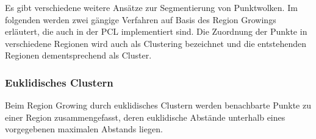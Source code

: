 Es gibt verschiedene weitere Ansätze zur Segmentierung von Punktwolken. Im folgenden werden zwei gängige Verfahren auf Basis des Region Growings erläutert, die auch in der PCL implementiert sind. Die Zuordnung der Punkte in verschiedene Regionen wird auch als Clustering bezeichnet und die entstehenden Regionen dem\-ent\-spre\-chend als Cluster. 


\subsubsection[Euklidisches Clustern (Schmelzer)]{Euklidisches Clustern}

Beim Region Growing durch euklidisches Clustern werden benachbarte Punkte zu ei\-ner Region zusammengefasst, deren euklidische Abstände unterhalb eines vorgegebenen maximalen Abstands liegen. 

